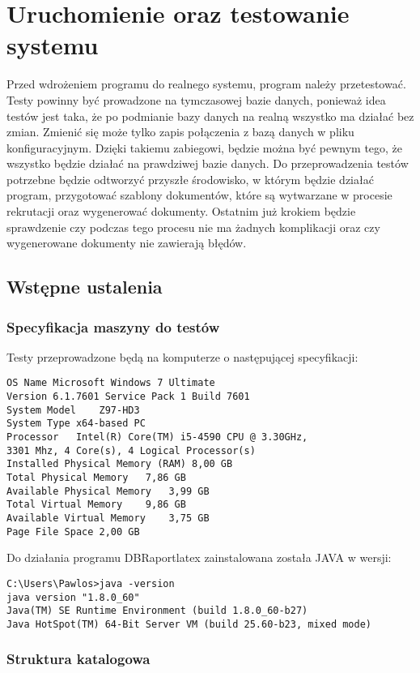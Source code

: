 \chapter{Uruchomienie oraz testowanie systemu}

Przed wdrożeniem programu do realnego systemu, program należy przetestować. Testy powinny być prowadzone na tymczasowej bazie danych, ponieważ idea testów jest taka, że po podmianie bazy danych na realną wszystko ma działać bez zmian. Zmienić się może tylko zapis połączenia z bazą danych w pliku konfiguracyjnym. Dzięki takiemu zabiegowi, będzie można być pewnym tego, że wszystko będzie działać na prawdziwej bazie danych.  Do przeprowadzenia testów potrzebne będzie  odtworzyć przyszłe środowisko, w którym będzie działać program, przygotować szablony dokumentów, które są wytwarzane w procesie rekrutacji oraz wygenerować dokumenty. Ostatnim już krokiem będzie sprawdzenie czy podczas tego procesu nie ma żadnych komplikacji oraz czy wygenerowane dokumenty nie zawierają błędów.
\section{Wstępne ustalenia}
\subsection{Specyfikacja maszyny do testów}
Testy przeprowadzone będą na komputerze o następującej specyfikacji:
\begin{verbatim}
OS Name	Microsoft Windows 7 Ultimate
Version	6.1.7601 Service Pack 1 Build 7601
System Model	Z97-HD3
System Type	x64-based PC
Processor	Intel(R) Core(TM) i5-4590 CPU @ 3.30GHz,
3301 Mhz, 4 Core(s), 4 Logical Processor(s)
Installed Physical Memory (RAM)	8,00 GB
Total Physical Memory	7,86 GB
Available Physical Memory	3,99 GB
Total Virtual Memory	9,86 GB
Available Virtual Memory	3,75 GB
Page File Space	2,00 GB
\end{verbatim}

Do działania programu DBRaportlatex zainstalowana została JAVA w wersji:
\begin{verbatim}
C:\Users\Pawlos>java -version
java version "1.8.0_60"
Java(TM) SE Runtime Environment (build 1.8.0_60-b27)
Java HotSpot(TM) 64-Bit Server VM (build 25.60-b23, mixed mode)
\end{verbatim}

\subsection{Struktura katalogowa}

